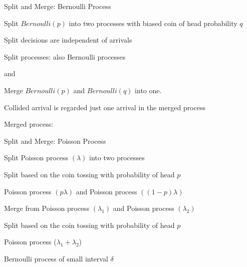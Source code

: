 \begin{frame}{Split and Merge: Bernoulli Process}

{
\small
\plitemsep 0.05in
\bci
\item Split $Bernoulli(p)$ into two processes with biased coin of head probability $q$

\item<2-> Split decisions are independent of arrivals

\item<3-> Split processes: also Bernoulli processes

\item<3->  and 

\eci

\medskip
\centering
{}

}
{
\small
\plitemsep 0.05in
\bci
\item Merge $Bernoulli(p)$ and $Bernoulli(q)$ into one.

\item<4-> Collided arrival is regarded just one arrival in the merged process

\item<5-> Merged process: 
\eci

\centering
{}

}

\end{frame}

\begin{frame}{Split and Merge: Poisson Process}

\plitemsep 0.1in
\bci
\item Split Poisson process $(\lambda)$ into two processes

\bci
\item<2-> Split based on the coin tossing with probability of head $p$

\item<3-> Poisson process $(p\lambda)$ and Poisson process $((1-p)\lambda)$
\eci

\item Merge from Poisson process $(\lambda_1)$ and Poisson process $(\lambda_2)$
\bci
\item<4-> Split based on the coin tossing with probability of head $p$

\item<5-> Poisson process ($\lambda_1 + \lambda_2$)

\item<6-> Bernoulli process of small interval $\delta$
\eci
\eci
\end{frame}

